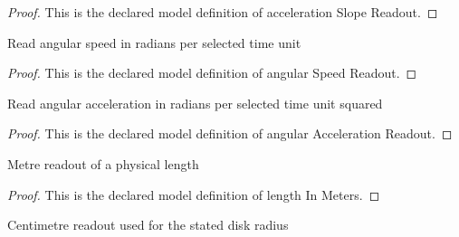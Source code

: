 \begin{proof}
  This is the declared model definition of acceleration Slope Readout.
\end{proof}
\begin{definition}
  \label{def:physics:phyx-mini-0772:phyxminiproblems-problemphyxmini0772-angularspeedreadout}
  Read angular speed in radians per selected time unit
\end{definition}
\begin{proof}
  This is the declared model definition of angular Speed Readout.
\end{proof}
\begin{definition}
  \label{def:physics:phyx-mini-0772:phyxminiproblems-problemphyxmini0772-angularaccelerationreadout}
  Read angular acceleration in radians per selected time unit squared
\end{definition}
\begin{proof}
  This is the declared model definition of angular Acceleration Readout.
\end{proof}
\begin{definition}
  \label{def:physics:phyx-mini-0772:phyxminiproblems-problemphyxmini0772-lengthinmeters}
  Metre readout of a physical length
\end{definition}
\begin{proof}
  This is the declared model definition of length In Meters.
\end{proof}
\begin{definition}
  \label{def:physics:phyx-mini-0772:phyxminiproblems-problemphyxmini0772-lengthincentimeters}
  Centimetre readout used for the stated disk radius
\end{definition}
